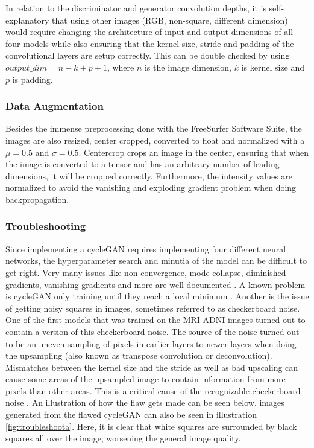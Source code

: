 \documentclass[12pt, fleqn, titlepage]{article}
\newcommand{\1}[1]{\mathds{1}\left[#1\right]}
\begin{document}
In relation to the discriminator and generator convolution depths, it is self-explanatory that using other images (RGB, non-square, different dimension) would require changing the architecture of input and output dimensions of all four models while also ensuring that the kernel size, stride and padding of the convolutional layers are setup correctly. This can be double checked by using $output\_dim = n - k + p + 1$, where $n$ is the image dimension, $k$ is kernel size and $p$ is padding.


\subsubsection{Data Augmentation}

Besides the immense preprocessing done with the FreeSurfer Software Suite, the images are also resized, center cropped, converted to float and normalized with a $ \mu = 0.5 $ and $ \sigma = 0.5$. Centercrop crops an image in the center, ensuring that when the image is converted to a tensor and has an arbitrary number of leading dimensions, it will be cropped correctly. Furthermore, the intensity values are normalized to avoid the vanishing and exploding gradient problem when doing backpropagation.


\subsubsection{Troubleshooting}\label{troubleshooting}
Since implementing a cycleGAN requires implementing four different neural networks, the hyperparameter search and minutia of the model can be difficult to get right. Very many issues like non-convergence, mode collapse, diminished gradients, vanishing gradients and more are well documented \cite{hard_to_train}. A known problem is cycleGAN only training until they reach a local minimum \cite{ganlocalminimum}. Another is the issue of getting noisy squares in images, sometimes referred to as checkerboard noise. One of the first models that was trained on the MRI ADNI images turned out to contain a version of this checkerboard noise. The source of the noise turned out to be an uneven sampling of pixels in earlier layers to newer layers when doing the upsampling (also known as transpose convolution or deconvolution). Mismatches between the kernel size and the stride as well as bad upscaling can cause some areas of the upsampled image to contain information from more pixels than other areas. This is a critical cause of the recognizable checkerboard noise \cite{checkerboard}. An illustration of how the flaw gets made can be seen below. images generated from the flawed cycleGAN can also be seen in illustration \ref{fig:troubleshoota}. Here, it is clear that white squares are surrounded by black squares all over the image, worsening the general image quality.
\end{document}
